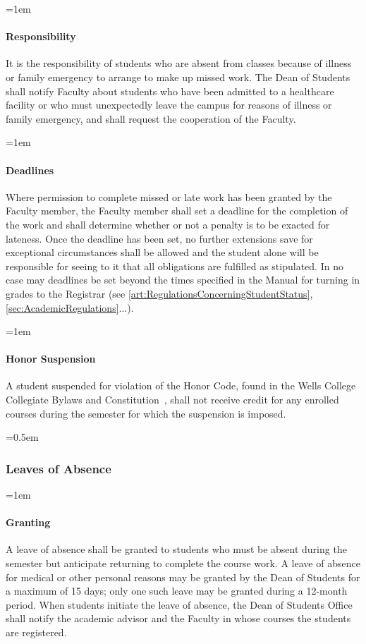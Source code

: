 \documentclass{manual}
\newcommand{\constitution}{Wells College Collegiate Bylaws and Constitution~}
\let\oldsubsubsection\subsubsection
\renewcommand\subsubsection{\leftskip=0.5em\oldsubsubsection}
\let\oldparagraph\paragraph
\renewcommand\paragraph{\leftskip=1em\oldparagraph}
\begin{document}
\paragraph{Responsibility}
It is the responsibility of students who are absent from classes because of illness or family emergency to arrange to make up missed work. The Dean of Students shall notify Faculty about students who have been admitted to a healthcare facility or who must unexpectedly leave the campus for reasons of illness or family emergency, and shall request the cooperation of the Faculty.

\paragraph{Deadlines}
Where permission to complete missed or late work has been granted by the Faculty member, the Faculty member shall set a deadline for the completion of the work and shall determine whether or not a penalty is to be exacted for lateness. Once the deadline has been set, no further extensions save for exceptional circumstances shall be allowed and the student alone will be responsible for seeing to it that all obligations are fulfilled as stipulated. In no case may deadlines be set beyond the times specified in the Manual for turning in grades to the Registrar (see \cref{art:RegulationsConcerningStudentStatus}, \cref{sec:AcademicRegulations}...).

\paragraph{Honor Suspension}
A student suspended for violation of the Honor Code, found in the \constitution, shall not receive credit for any enrolled courses during the semester for which the suspension is imposed.

\subsubsection{Leaves of Absence}

\paragraph{Granting} 

A leave of absence shall be granted to students who must be absent during the semester but anticipate returning to complete the course work. A leave of absence for medical or other personal reasons may be granted by the Dean of Students for a maximum of 15 days; only one such leave may be granted during a 12-month period. When students initiate the leave of absence, the Dean of Students Office shall notify the academic advisor and the Faculty in whose courses the students are registered.
\end{document}
